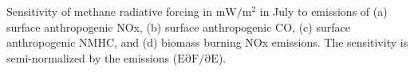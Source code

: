 Sensitivity of methane radiative forcing in $\mathrm{mW/m^2}$ in July to emissions of (a) surface anthropogenic NOx, (b) surface anthropogenic CO, (c) surface anthropogenic NMHC, and (d) biomass burning NOx emissions. The sensitivity is semi-normalized by the emissions ($\mathrm{E \partial F/\partial E}$). \label{fig:rfsens}